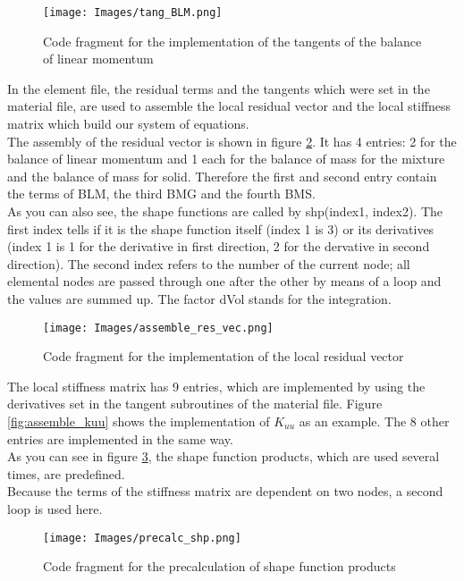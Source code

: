 \documentclass[12pt]{article}
\begin{document}
\begin{figure}[H]
	\centering
	\texttt{[image: Images/tang\_BLM.png]}
	\caption{Code fragment for the implementation of the tangents of the balance of linear momentum}
	\label{fig:tang_BLM}
\end{figure}

In the element file, the residual terms and the tangents which were set in the material file, are used to assemble the local residual vector and the local stiffness matrix which build our system of equations. \\
The assembly of the residual vector is shown in figure \ref{fig:assemble_res_vec}. It has 4 entries: 2 for the balance of linear momentum and 1 each for the balance of mass for the mixture and the balance of mass for solid. Therefore the first and second entry contain the terms of BLM, the third BMG and the fourth BMS. \\
As you can also see, the shape functions are called by shp(index1, index2). The first index tells if it is the shape function itself (index 1 is 3) or its derivatives (index 1 is 1 for the derivative in first direction, 2 for the dervative in second direction). The second index refers to the number of the current node; all elemental nodes are passed through one after the other by means of a loop and the values are summed up. The factor dVol stands for the integration. \\

\begin{figure}[H]

	\centering
	\texttt{[image: Images/assemble\_res\_vec.png]}
	\caption{Code fragment for the implementation of the local residual vector}
		\label{fig:assemble_res_vec}
\end{figure}

The local stiffness matrix has 9 entries, which are implemented by using the derivatives set in the tangent subroutines of the material file. Figure \ref{fig:assemble_kuu} shows the implementation of $K_{uu}$ as an example. The 8 other entries are implemented in the same way. \\
As you can see in figure \ref{fig:precalc_shp}, the shape function products, which are used several times, are predefined. \\
Because the terms of the stiffness matrix are dependent on two nodes, a second loop is used here. \\

\begin{figure}[H]
	
	\centering
	\texttt{[image: Images/precalc\_shp.png]}
	\caption{Code fragment for the precalculation of shape function products}
	\label{fig:precalc_shp}
\end{figure}
\end{document}
